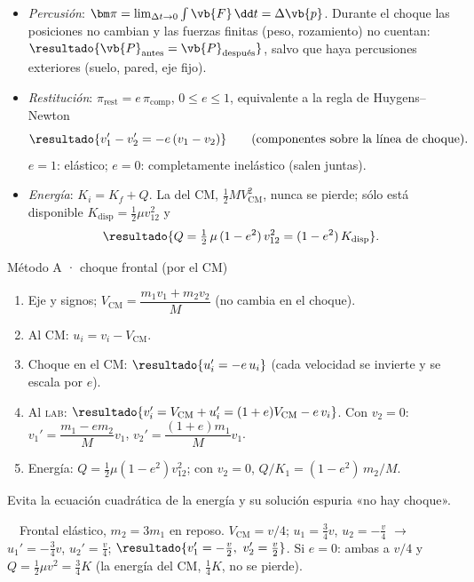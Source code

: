 \documentclass[11pt,a4paper,twoside]{article}
\newcommand{\cm}{_{\mathrm{CM}}}
\newcommand{\lab}{\textup{\textsc{lab}}}
\newcommand{\ej}[2]{\par\addvspace{1.2ex}\noindent{\color{cian}\bfseries P#1}\ \ {\color{tenue}#2.}\enspace\ignorespaces}
\begin{document}
\begin{itemize}[leftmargin=1.3em]
  \item \emph{Percusión}: $\bm\pi=\lim_{\Delta t\to0}\int\vb{F}\,\dd t=\Delta\vb{p}$. Durante el choque las posiciones no cambian y
        las fuerzas finitas (peso, rozamiento) no cuentan: $\resultado{\vb{P}_{\text{antes}}=\vb{P}_{\text{después}}}$, salvo que haya
        percusiones exteriores (suelo, pared, eje fijo).
  \item \emph{Restitución}: $\pi_{\text{rest}}=e\,\pi_{\text{comp}}$, $0\le e\le1$, equivalente a la regla de Huygens--Newton
        \[
          \resultado{v_{1}'-v_{2}'=-e\,(v_{1}-v_{2})}\qquad(\text{componentes sobre la línea de choque}).
        \]
        $e=1$: elástico; $e=0$: completamente inelástico (salen juntas).
  \item \emph{Energía}: $K_{i}=K_{f}+Q$. La del CM, $\tfrac12MV\cm^{2}$, nunca se pierde; sólo está disponible
        $K_{\text{disp}}=\tfrac12\mu v_{12}^{2}$ y
        \[
          \resultado{Q=\tfrac12\,\mu\,(1-e^{2})\,v_{12}^{2}=(1-e^{2})\,K_{\text{disp}}} .
        \]
\end{itemize}

\begin{clave}{Método A · choque frontal (por el CM)}
\begin{enumerate}[leftmargin=1.4em]
  \item Eje y signos; $V\cm=\dfrac{m_{1}v_{1}+m_{2}v_{2}}{M}$ (no cambia en el choque).
  \item Al CM: $u_{i}=v_{i}-V\cm$.
  \item Choque en el CM: $\resultado{u_{i}'=-e\,u_{i}}$ (cada velocidad se invierte y se escala por $e$).
  \item Al \lab: $\resultado{v_{i}'=V\cm+u_{i}'=(1+e)V\cm-e\,v_{i}}$. Con $v_{2}=0$:
        $v_{1}'=\dfrac{m_{1}-em_{2}}{M}v_{1}$, $v_{2}'=\dfrac{(1+e)m_{1}}{M}v_{1}$.
  \item Energía: $Q=\tfrac12\mu(1-e^{2})v_{12}^{2}$; con $v_{2}=0$, $Q/K_{1}=(1-e^{2})\,m_{2}/M$.
\end{enumerate}
Evita la ecuación cuadrática de la energía y su solución espuria «no hay choque».
\end{clave}

\ej{3}{Frontal elástico, $m_{2}=3m_{1}$ en reposo}
$V\cm=v/4$; $u_{1}=\frac34v$, $u_{2}=-\frac v4$ $\to$ $u_{1}'=-\frac34v$, $u_{2}'=\frac v4$; $\resultado{v_{1}'=-\frac v2,\ v_{2}'=\frac v2}$.
Si $e=0$: ambas a $v/4$ y $Q=\tfrac12\mu v^{2}=\tfrac34K$ (la energía del CM, $\tfrac14K$, no se pierde).
\end{document}
